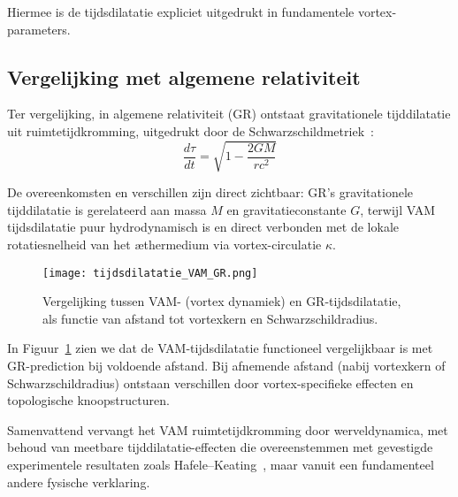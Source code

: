 Hiermee is de tijdsdilatatie expliciet uitgedrukt in fundamentele vortex-parameters.

\subsection{Vergelijking met algemene relativiteit}

Ter vergelijking, in algemene relativiteit (GR) ontstaat gravitationele tijddilatatie uit ruimtetijdkromming, uitgedrukt door de Schwarzschildmetriek~\cite{schutz2009first}:
\begin{equation}\label{eq:GRtijd}
    \frac{d\tau}{dt} = \sqrt{1 - \frac{2GM}{rc^2}}
\end{equation}

De overeenkomsten en verschillen zijn direct zichtbaar: GR's gravitationele tijddilatatie is gerelateerd aan massa $M$ en gravitatieconstante $G$, terwijl VAM tijdsdilatatie puur hydrodynamisch is en direct verbonden met de lokale rotatiesnelheid van het æthermedium via vortex-circulatie $\kappa$.

\begin{figure}[ht!]
    \centering
    \texttt{[image: tijdsdilatatie\_VAM\_GR.png]}
    \caption{Vergelijking tussen VAM- (vortex dynamiek) en GR-tijdsdilatatie, als functie van afstand tot vortexkern en Schwarzschildradius.}
    \label{fig:vergelijkingVAMGR}
\end{figure}

In Figuur~\ref{fig:vergelijkingVAMGR} zien we dat de VAM-tijdsdilatatie functioneel vergelijkbaar is met GR-prediction bij voldoende afstand. Bij afnemende afstand (nabij vortexkern of Schwarzschildradius) ontstaan verschillen door vortex-specifieke effecten en topologische knoopstructuren.

Samenvattend vervangt het VAM ruimtetijdkromming door werveldynamica, met behoud van meetbare tijddilatatie-effecten die overeenstemmen met gevestigde experimentele resultaten zoals Hafele–Keating~\cite{hafele1972around}, maar vanuit een fundamenteel andere fysische verklaring.

